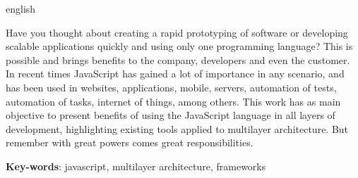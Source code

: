 \documentclass[
	12pt,				%
	openright,			%
	twoside,			%
	a4paper,			%
	english,			%
	brazil				%
	]{abntex2}
\begin{document}
\begin{resumo}[Abstract]
 \begin{otherlanguage*}{english}

Have you thought about creating a rapid prototyping of software or developing scalable applications quickly and using only one programming language? This is possible and brings benefits to the company, developers and even the customer. In recent times JavaScript has gained a lot of importance in any scenario, and has been used in websites, applications, mobile, servers, automation of tests, automation of tasks, internet of things, among others. This work has as main objective to present benefits of using the JavaScript language in all layers of development, highlighting existing tools applied to multilayer architecture. But remember with great powers comes great responsibilities.

   \vspace{\onelineskip}
 
   \noindent 
   \textbf{Key-words}: javascript, multilayer architecture, frameworks
 \end{otherlanguage*}
\end{resumo}
\listoffigures*
\cleardoublepage

\end{document}
